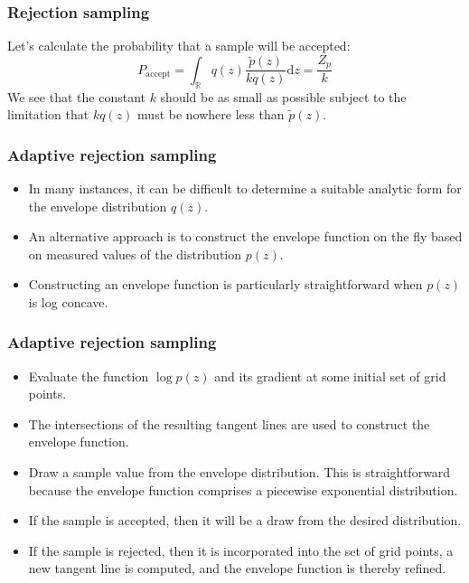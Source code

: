 \documentclass{beamer}
\begin{document}
\begin{frame}
    \frametitle{Rejection sampling}
    Let's calculate the probability that a sample will be accepted:
    \begin{equation*}
        P_{\textrm{accept}}=\int_{\mathbb{R}}q(z)\frac{\tilde{p}(z)}{kq(z)}\mathrm{d}z=\frac{Z_{p}}{k}
    \end{equation*}
    We see that the constant $k$ should be as small as possible subject to the limitation that $kq(z)$ must be nowhere less than $\tilde{p}(z)$.
\end{frame}

\begin{frame}
    \frametitle{Adaptive rejection sampling}
    \begin{itemize}
        \item In many instances, it can be difficult to determine a suitable analytic form for the envelope distribution $q(z)$.
        \item An alternative approach is to construct the envelope function on the fly based on measured values of the distribution $p(z)$.
        \item Constructing an envelope function is particularly straightforward when $p(z)$ is log concave.
    \end{itemize}
\end{frame}

\begin{frame}
    \frametitle{Adaptive rejection sampling}
    \begin{itemize}
        \item Evaluate the function $\log{}p(z)$ and its gradient at some initial set of grid points.
        \item The intersections of the resulting tangent lines are used to construct the envelope function.
        \item Draw a sample value from the envelope distribution. This is straightforward because the envelope function comprises a piecewise exponential distribution.
        \item If the sample is accepted, then it will be a draw from the desired distribution.
        \item If the sample is rejected, then it is incorporated into the set of grid points, a new tangent line is computed, and the envelope function is thereby refined.
    \end{itemize}
\end{frame}
\end{document}
